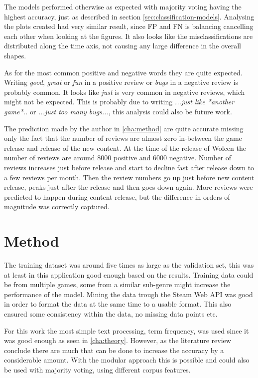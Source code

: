 The models performed otherwise as expected with majority voting having the highest accuracy, just as described in section \autoref{sec:classification-models}. 
Analysing the plots created had very similar result, since FP and FN is balancing cancelling each other when looking at the figures. 
It also looks like the misclassifications are distributed along the time axis, not causing any large difference in the overall shapes. 


As for the most common positive and negative words they are quite expected. 
Writing \emph{good}, \emph{great} or \emph{fun} in a positive review or \emph{bugs} in a negative review is probably common. 
It looks like \emph{just} is very common in negative reviews, which might not be expected. 
This is probably due to writing \emph{...just like *another game*..} or \emph{...just too many bugs...}, this analysis could also be future work.


The prediction made by the author in \autoref{cha:method} are quite accurate missing only the fact that the number of reviews are almost zero in-between the game release and release of the new content. 
At the time of the release of Wolcen the number of reviews are around 8000 positive and 6000 negative. 
Number of reviews increases just before release and start to decline fast after release down to a few reviews per month. 
Then the review numbers go up just before new content release, peaks just after the release and then goes down again. 
More reviews were predicted to happen during content release, but the difference in orders of magnitude was correctly captured. 


\section{Method}
\label{sec:discussion-method}


The training dataset was around five times as large as the validation set, this was at least in this application good enough based on the results. 
Training data could be from multiple games, some from a similar sub-genre might increase the performance of the model. 
Mining the data trough the Steam Web API was good in order to format the data at the same time to a usable format. 
This also ensured some consistency within the data, no missing data points etc. 


For this work the most simple text processing, term frequency, was used since it was good enough as seen in \autoref{cha:theory}. 
However, as the literature review conclude there are much that can be done to increase the accuracy by a considerable amount. 
With the modular approach this is possible and could also be used with majority voting, using different corpus features. 



